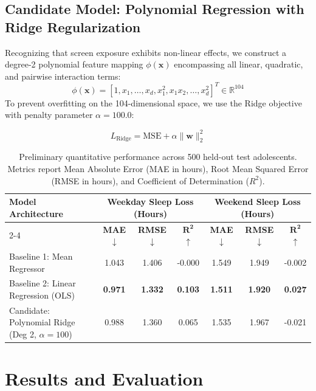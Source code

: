\documentclass[11pt]{article}
\begin{document}
\subsection{Candidate Model: Polynomial Regression with Ridge Regularization}
Recognizing that screen exposure exhibits non-linear effects, we construct a degree-2 polynomial feature mapping $\phi(\mathbf{x})$ encompassing all linear, quadratic, and pairwise interaction terms:
\begin{equation}
    \phi(\mathbf{x}) = [1, x_1, \dots, x_d, x_1^2, x_1 x_2, \dots, x_d^2]^T \in \mathbb{R}^{104}
\end{equation}
To prevent overfitting on the 104-dimensional space, we use the Ridge objective with penalty parameter $\alpha = 100.0$:

\begin{equation}
    {L}_{\text{Ridge}} = \text{MSE} + \alpha \|\mathbf{w}\|_2^2
\end{equation}

\begin{table}[t]
\centering
\small
\begin{tabular}{lcccccc}
\hline
\textbf{Model Architecture} & \multicolumn{3}{c}{\textbf{Weekday Sleep Loss (Hours)}} & \multicolumn{3}{c}{\textbf{Weekend Sleep Loss (Hours)}} \\
\cline{2-4} \cline{5-7}
& \textbf{MAE} $\downarrow$ & \textbf{RMSE} $\downarrow$ & $\mathbf{R^2}$ $\uparrow$ & \textbf{MAE} $\downarrow$ & \textbf{RMSE} $\downarrow$ & $\mathbf{R^2}$ $\uparrow$ \\
\hline
Baseline 1: Mean Regressor & 1.043 & 1.406 & -0.000 & 1.549 & 1.949 & -0.002 \\
Baseline 2: Linear Regression (OLS) & \textbf{0.971} & \textbf{1.332} & \textbf{0.103} & \textbf{1.511} & \textbf{1.920} & \textbf{0.027} \\
Candidate: Polynomial Ridge (Deg 2, $\alpha=100$) & 0.988 & 1.360 & 0.065 & 1.535 & 1.967 & -0.021 \\
\hline
\end{tabular}
\caption{Preliminary quantitative performance across 500 held-out test adolescents. Metrics report Mean Absolute Error (MAE in hours), Root Mean Squared Error (RMSE in hours), and Coefficient of Determination ($R^2$).}
\label{tab:results}
\end{table}

\section{Results and Evaluation}
\label{sec:results}
\end{document}

